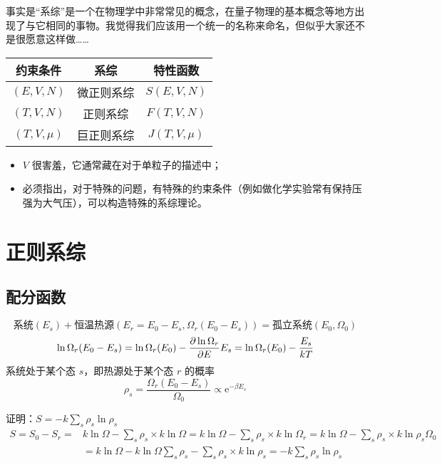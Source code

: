 事实是“系综”是一个在物理学中非常常见的概念，在量子物理的基本概念等地方出现了与它相同的事物。我觉得我们应该用一个统一的名称来命名，但似乎大家还不是很愿意这样做……

\begin{table}[H]
    \centering
    \begin{tabular}{|c|c|c|}
        \hline
        约束条件 & 系综 & 特性函数 \\
        \hline
        $(E, V, N)$ & 微正则系综 & $S(E, V, N)$ \\
        \hline
        $(T, V, N)$ & 正则系综 & $F(T, V, N)$ \\
        \hline
        $(T, V, \mu)$ & 巨正则系综 & $J(T, V, \mu)$\\
        \hline
    \end{tabular}
\end{table}

\begin{itemize}
    \item $V$ 很害羞，它通常藏在对于单粒子的描述中；
    \item 必须指出，对于特殊的问题，有特殊的约束条件（例如做化学实验常有保持压强为大气压），可以构造特殊的系综理论。
\end{itemize}

\section{正则系综}

\subsection{配分函数}

\[
\text{系统}(E_s) + \text{恒温热源} (E_r = E_0 - E_s, \Omega_r(E_0 - E_s)) = \text{孤立系统} (E_0, \Omega_0)
\] \[
\ln{\Omega_r (E_0 - E_s)} = \ln{\Omega_r (E_0)} - \pdv{\ln{\Omega_r}}{E} E_s = \ln{\Omega_r (E_0)} - \frac{E_s}{k T}
\] 系统处于某个态 $s$，即热源处于某个态 $r$ 的概率 \[
\rho_s = \frac{\Omega_r (E_0 - E_s)}{\Omega_0} \propto \mathrm{e}^{- \beta E_s}
\]

\begin{framed}
证明：$S = - k \sum_s \rho_s \ln{\rho_s}$
\[\begin{aligned}
    S = S_0 - S_r = & k \ln{\Omega} - \sum_s \rho_s \times k \ln{\Omega} = k \ln{\Omega} - \sum_s \rho_s \times k \ln{\Omega_r} = k \ln{\Omega} - \sum_s \rho_s \times k \ln{\rho_s \Omega_0}\\
    & = k \ln{\Omega} - k \ln{\Omega} \sum_s \rho_s - \sum_s \rho_s \times k \ln{\rho_s} = - k \sum_s \rho_s \ln{\rho_s}
\end{aligned}\]
\end{framed}


